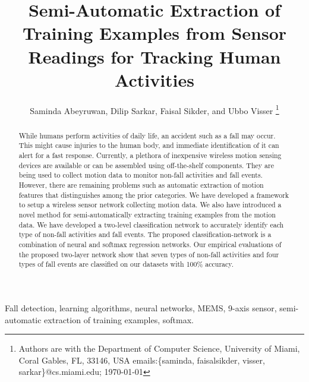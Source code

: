\documentclass[]{IEEEtran}
\title{Semi-Automatic Extraction of Training Examples from Sensor Readings for Tracking Human Activities}
\author{{Saminda Abeyruwan}, {Dilip Sarkar}, {Faisal Sikder}, and {Ubbo Visser}
\thanks{ Authors are with
 the
Department of Computer Science, University of Miami,
  Coral Gables, FL, 33146, USA
{ emails:\{saminda, faisalsikder, visser, sarkar\}@cs.miami.edu};
\today} }
\begin{document}
\maketitle

\begin{abstract}
While humans perform activities of daily life, an accident 
such as a fall may occur. This might cause injuries to the human body, and immediate identification of it can alert for a fast response.  Currently, a plethora of inexpensive wireless motion sensing devices are available or can be assembled using off-the-shelf components. They are being used to collect motion data to monitor non-fall activities and fall events. However, there are remaining problems such as automatic extraction of motion features that distinguishes among the prior categories. We have developed a framework to setup a wireless sensor network collecting motion data. We also have introduced a novel method for semi-automatically extracting training examples from the motion data. We have developed a two-level classification network to accurately identify each type of non-fall activities and fall events. The proposed classification-network is a combination of neural and softmax regression networks.  Our empirical evaluations of the proposed two-layer network show that seven types of non-fall activities and four types of fall events are classified on our datasets with 100\% accuracy. 
\end{abstract}

\begin{IEEEkeywords} Fall detection, learning algorithms, neural networks, {MEMS}, 9-axis sensor, semi-automatic extraction of training examples, softmax.
\end{IEEEkeywords}

\end{document}
